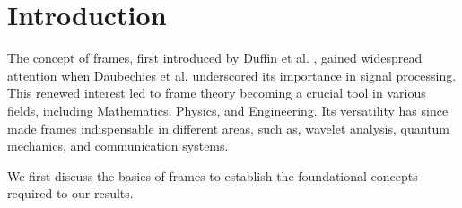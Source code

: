 \documentclass[article,12pt]{amsart}
\begin{document}
\maketitle



\section{Introduction}
The concept of frames, first introduced by Duffin et al. \cite{duffin1952class}, gained widespread attention when Daubechies et al. \cite{2} underscored its importance in signal processing. This renewed interest led to frame theory becoming a crucial tool in various fields, including Mathematics, Physics, and Engineering. Its versatility has since made frames indispensable in different areas, such as, wavelet analysis, quantum mechanics, and communication systems.

We first discuss the basics of frames to establish the foundational concepts required to our results.
 
\end{document}
